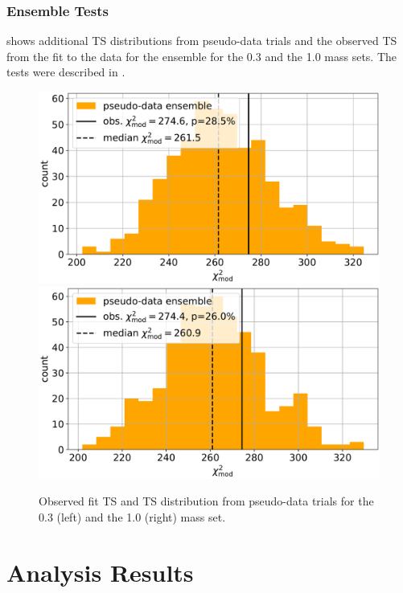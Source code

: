 

\subsection{Ensemble Tests} 

 shows additional TS distributions from pseudo-data trials and the observed TS from the fit to the data for the ensemble for the \SI{0.3}{\gev} and the \SI{1.0}{\gev} mass sets. The tests were described in .

\begin{figure}[h]
    \includegraphics[width=0.49\linewidth]{figures/results/blind_fits/full_blind_fit_0.6_GeV_gauss_plus_poisson_step_3_4-1.png}
    \includegraphics[width=0.49\linewidth]{figures/results/blind_fits/full_blind_fit_1.0_GeV_gauss_plus_poisson_step_3_4-1.png}
	\caption[Pseudo-data trials TS distribution (\SI{0.3}{\gev}, \SI{1.0}{\gev})]{Observed fit TS and TS distribution from pseudo-data trials for the \SI{0.3}{\gev} (left) and the \SI{1.0}{\gev} (right) mass set.}
\end{figure}


\chapter{Analysis Results}


